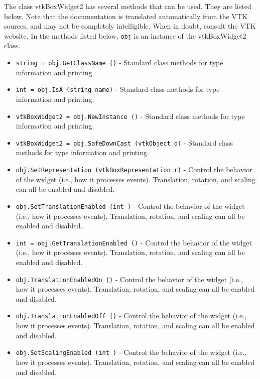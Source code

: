 The class vtkBoxWidget2 has several methods that can be used.
  They are listed below.
Note that the documentation is translated automatically from the VTK sources,
and may not be completely intelligible.  When in doubt, consult the VTK website.
In the methods listed below, \verb|obj| is an instance of the vtkBoxWidget2 class.
\begin{itemize}
\item  \verb|string = obj.GetClassName ()| -  Standard class methods for type information and printing.

\item  \verb|int = obj.IsA (string name)| -  Standard class methods for type information and printing.

\item  \verb|vtkBoxWidget2 = obj.NewInstance ()| -  Standard class methods for type information and printing.

\item  \verb|vtkBoxWidget2 = obj.SafeDownCast (vtkObject o)| -  Standard class methods for type information and printing.

\item  \verb|obj.SetRepresentation (vtkBoxRepresentation r)| -  Control the behavior of the widget (i.e., how it processes
 events). Translation, rotation, and scaling can all be enabled and
 disabled.

\item  \verb|obj.SetTranslationEnabled (int )| -  Control the behavior of the widget (i.e., how it processes
 events). Translation, rotation, and scaling can all be enabled and
 disabled.

\item  \verb|int = obj.GetTranslationEnabled ()| -  Control the behavior of the widget (i.e., how it processes
 events). Translation, rotation, and scaling can all be enabled and
 disabled.

\item  \verb|obj.TranslationEnabledOn ()| -  Control the behavior of the widget (i.e., how it processes
 events). Translation, rotation, and scaling can all be enabled and
 disabled.

\item  \verb|obj.TranslationEnabledOff ()| -  Control the behavior of the widget (i.e., how it processes
 events). Translation, rotation, and scaling can all be enabled and
 disabled.

\item  \verb|obj.SetScalingEnabled (int )| -  Control the behavior of the widget (i.e., how it processes
 events). Translation, rotation, and scaling can all be enabled and
 disabled.


\end{itemize}
